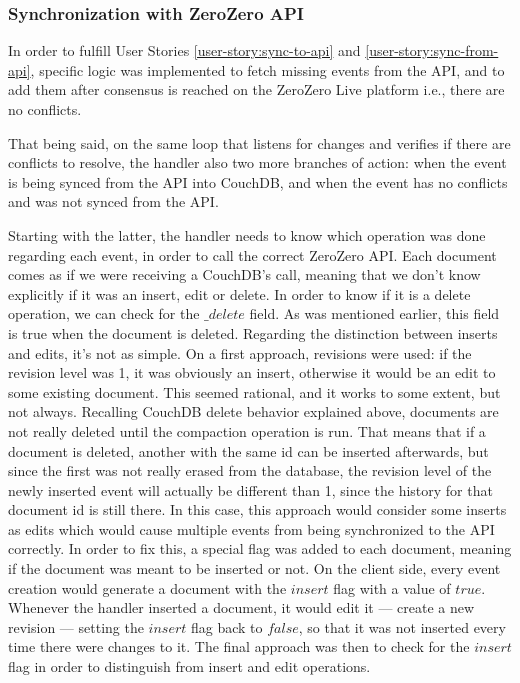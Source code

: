 \subsubsection{Synchronization with ZeroZero API} \label{sec:api-sync}

In order to fulfill User Stories \ref{user-story:sync-to-api} and \ref{user-story:sync-from-api}, specific logic was implemented to fetch missing events from the API, and to add them after consensus is reached on the ZeroZero Live platform i.e., there are no conflicts.

That being said, on the same loop that listens for changes and verifies if there are conflicts to resolve, the handler also two more branches of action: when the event is being synced from the API into CouchDB, and when the event has no conflicts and was not synced from the API.

Starting with the latter, the handler needs to know which operation was done regarding each event, in order to call the correct ZeroZero API. Each document comes as if we were receiving a CouchDB's  call, meaning that we don't know explicitly if it was an insert, edit or delete. In order to know if it is a delete operation, we can check for the $\_delete$ field. As was mentioned earlier, this field is true when the document is deleted. Regarding the distinction between inserts and edits, it's not as simple. On a first approach, revisions were used: if the revision level was 1, it was obviously an insert, otherwise it would be an edit to some existing document. This seemed rational, and it works to some extent, but not always. Recalling CouchDB delete behavior explained above, documents are not really deleted until the compaction operation is run. That means that if a document is deleted, another with the same id can be inserted afterwards, but since the first was not really erased from the database, the revision level of the newly inserted event will actually be different than 1, since the history for that document id is still there. In this case, this approach would consider some inserts as edits which would cause multiple events from being synchronized to the API correctly. In order to fix this, a special flag was added to each document, meaning if the document was meant to be inserted or not. On the client side, every event creation would generate a document with the $insert$ flag with a value of $true$. Whenever the handler inserted a document, it would edit it --- create a new revision --- setting the $insert$ flag back to $false$, so that it was not inserted every time there were changes to it. The final approach was then to check for the $insert$ flag in order to distinguish from insert and edit operations.


